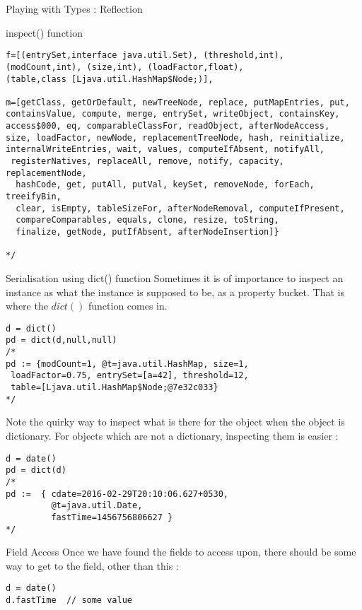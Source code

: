 \begin{section}{Playing with Types : Reflection}
\begin{subsection}{inspect() function}
\begin{lstlisting}[style=JexlStyle]
f=[(entrySet,interface java.util.Set), (threshold,int), 
(modCount,int), (size,int), (loadFactor,float), 
(table,class [Ljava.util.HashMap$Node;)], 

m=[getClass, getOrDefault, newTreeNode, replace, putMapEntries, put, 
containsValue, compute, merge, entrySet, writeObject, containsKey, 
access$000, eq, comparableClassFor, readObject, afterNodeAccess, 
size, loadFactor, newNode, replacementTreeNode, hash, reinitialize, 
internalWriteEntries, wait, values, computeIfAbsent, notifyAll,
 registerNatives, replaceAll, remove, notify, capacity, replacementNode,
  hashCode, get, putAll, putVal, keySet, removeNode, forEach, treeifyBin, 
  clear, isEmpty, tableSizeFor, afterNodeRemoval, computeIfPresent, 
  compareComparables, equals, clone, resize, toString, 
  finalize, getNode, putIfAbsent, afterNodeInsertion]}

*/
\end{lstlisting}
\end{subsection}

\begin{subsection}{Serialisation using dict() function}
Sometimes it is of importance to inspect an instance as 
what the instance is supposed to be, as a property bucket.
That is where the $dict()$ function comes in.

\begin{lstlisting}[style=JexlStyle]
d = dict()
pd = dict(d,null,null)
/* 
pd := {modCount=1, @t=java.util.HashMap, size=1, 
 loadFactor=0.75, entrySet=[a=42], threshold=12, 
 table=[Ljava.util.HashMap$Node;@7e32c033} 
*/
\end{lstlisting}
Note the quirky way to inspect what is there for the object when the object is dictionary.
For objects which are not a dictionary, inspecting them is easier :

\begin{lstlisting}[style=JexlStyle]
d = date()
pd = dict(d)
/* 
pd :=  { cdate=2016-02-29T20:10:06.627+0530, 
         @t=java.util.Date, 
         fastTime=1456756806627 } 
*/
\end{lstlisting}
\end{subsection}

\begin{subsection}{Field Access}
Once we have found the fields to access upon, 
there should be some way to get to the field, other than this :

\begin{lstlisting}[style=JexlStyle]
d = date()
d.fastTime  // some value 
\end{lstlisting}


\end{subsection}
\end{section}
